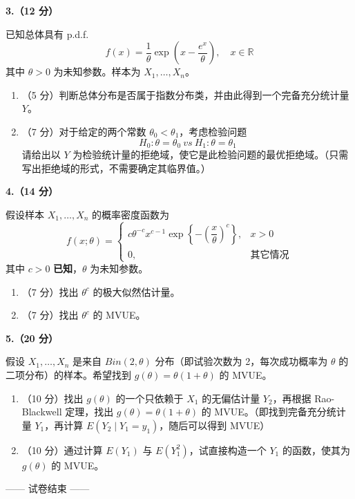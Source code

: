 \documentclass[12pt,a4paper]{ctexart}
\newcommand{\question}[1]{\bigskip\noindent\textbf{#1}\par\nobreak\medskip}
\begin{document}
\question{3.（12 分）}
已知总体具有 p.d.f.
\[ f(x)=\frac{1}{\theta}\exp\left(x-\frac{e^{x}}{\theta}\right),\quad x\in\mathbb{R} \]
其中 $\theta>0$ 为未知参数。样本为 $X_{1},\ldots,X_{n}$。
\begin{enumerate}[label=(\arabic*),leftmargin=2.4em]
  \item （5 分）判断总体分布是否属于指数分布类，并由此得到一个完备充分统计量 $Y$。
  \item （7 分）对于给定的两个常数 $\theta_{0}<\theta_{1}$，考虑检验问题
  \[ H_{0}:\theta=\theta_{0}\ vs\ H_{1}:\theta=\theta_{1} \]
  请给出以 $Y$ 为检验统计量的拒绝域，使它是此检验问题的最优拒绝域。（只需写出拒绝域的形式，不需要确定其临界值。）
\end{enumerate}

\question{4.（14 分）}
假设样本 $X_{1},\ldots,X_{n}$ 的概率密度函数为
\[ f(x;\theta)=\begin{cases} c\theta^{-c}x^{c-1}\exp\left\{-\left(\dfrac{x}{\theta}\right)^{c}\right\}, & x>0 \\[2mm] 0, & \text{其它情况} \end{cases} \]
其中 $c>0$ \textbf{已知}，$\theta$ 为未知参数。
\begin{enumerate}[label=(\arabic*),leftmargin=2.4em]
  \item （7 分）找出 $\theta^{c}$ 的极大似然估计量。
  \item （7 分）找出 $\theta^{c}$ 的 MVUE。
\end{enumerate}

\question{5.（20 分）}
假设 $X_{1},\ldots,X_{n}$ 是来自 $Bin(2,\theta)$ 分布（即试验次数为 2，每次成功概率为 $\theta$ 的二项分布）的样本。希望找到 $g(\theta)=\theta(1+\theta)$ 的 MVUE。
\begin{enumerate}[label=(\arabic*),leftmargin=2.4em]
  \item （10 分）找出 $g(\theta)$ 的一个只依赖于 $X_{1}$ 的无偏估计量 $Y_{2}$，再根据 Rao-Blackwell 定理，找出 $g(\theta)=\theta(1+\theta)$ 的 MVUE。（即找到完备充分统计量 $Y_{1}$，再计算 $E\left(Y_{2}\mid Y_{1}=y_{1}\right)$，随后可以得到 MVUE）
  \item （10 分）通过计算 $E(Y_{1})$ 与 $E(Y_{1}^{2})$，试直接构造一个 $Y_{1}$ 的函数，使其为 $g(\theta)$ 的 MVUE。
\end{enumerate}

\vfill
\begin{center}\small —— 试卷结束 ——\end{center}
\end{document}
